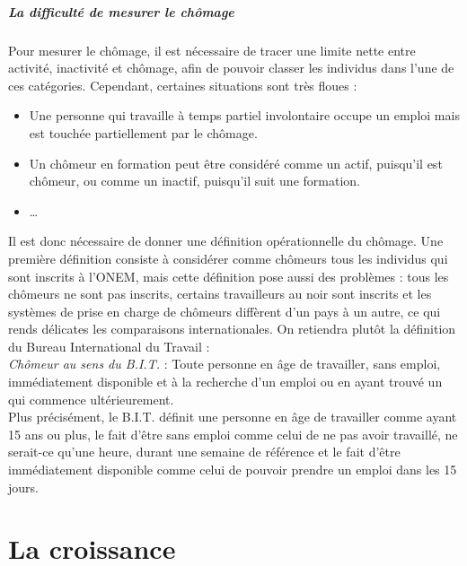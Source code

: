 \documentclass[10pt]{book}
\begin{document}
\subsubsection{La difficulté de mesurer le chômage}
Pour mesurer le chômage, il est nécessaire de tracer une limite nette entre activité, inactivité et chômage, afin de pouvoir classer les individus dans l'une de ces catégories. Cependant, certaines situations sont très floues : 
\begin{itemize}
  \item Une personne qui travaille à temps partiel involontaire occupe un emploi mais est touchée partiellement par le chômage.
  \item Un chômeur en formation peut être considéré comme un actif, puisqu'il est chômeur, ou comme un inactif, puisqu'il suit une formation.
  \item \ldots
\end{itemize}
Il est donc nécessaire de donner une définition opérationnelle du chômage. Une première définition consiste à considérer comme chômeurs tous les individus qui sont inscrits à l'ONEM, mais cette définition pose aussi des problèmes : tous les chômeurs ne sont pas inscrits, certains travailleurs au noir sont inscrits et les systèmes de prise en charge de chômeurs diffèrent d'un pays à un autre, ce qui rends délicates les comparaisons internationales. On retiendra plutôt la définition du Bureau International du Travail : \\
\textit{Chômeur au sens du B.I.T.} : Toute personne en âge de travailler, sans emploi, immédiatement disponible et à la recherche d'un emploi ou en ayant trouvé un qui commence ultérieurement. \\
Plus précisément, le B.I.T. définit une personne en âge de travailler comme ayant 15 ans ou plus, le fait d'être sans emploi comme celui de ne pas avoir travaillé, ne serait-ce qu'une heure, durant une semaine de référence et le fait d'être immédiatement disponible comme celui de pouvoir prendre un emploi dans les 15 jours.

\part{La croissance}
\end{document}
